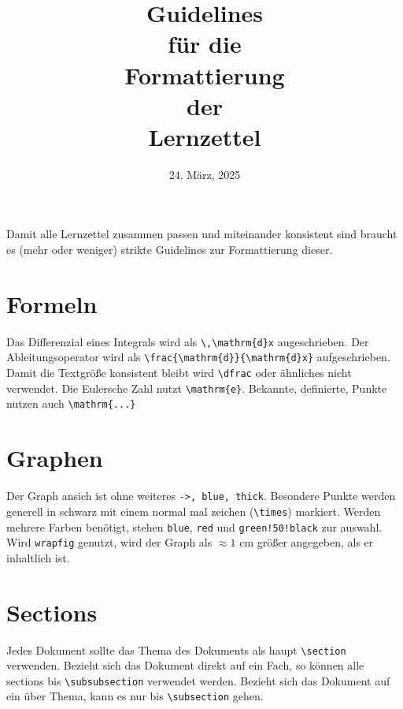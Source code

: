 \documentclass{article}
\title{
 \LARGE{Guidelines} \\
 \normalsize{für die} \\ [-0.8em]
 \LARGE{Formattierung} \\
 \normalsize{der} \\ [-0.8em]
 \LARGE{Lernzettel} 
}
\date{24. März, 2025}
\begin{document}
 
\maketitle
 
\noindent Damit alle Lernzettel zusammen passen und miteinander konsistent sind braucht es (mehr oder weniger) strikte Guidelines zur Formattierung dieser.
 
\section{Formeln}
Das Differenzial eines Integrals wird als \verb|\,\mathrm{d}x| augeschrieben. Der Ableitungsoperator wird als \verb|\frac{\mathrm{d}}{\mathrm{d}x}| aufgeschrieben. \newline
Damit die Textgröße konsistent bleibt wird \verb|\dfrac| oder ähnliches nicht verwendet. \newline
Die Eulersche Zahl nutzt \verb|\mathrm{e}|. Bekannte, definierte, Punkte nutzen auch \verb|\mathrm{...}|
 
\section{Graphen}
Der Graph ansich ist ohne weiteres \verb|->, blue, thick|. Besondere Punkte werden generell in schwarz mit einem normal mal zeichen (\verb|\times|) markiert. Werden mehrere Farben benötigt, stehen \verb|blue|, \verb|red| und \verb|green!50!black| zur auswahl. \newline
Wird \verb|wrapfig| genutzt, wird der Graph als $\approx 1$ cm größer angegeben, als er inhaltlich ist. 
 
\section{Sections}
Jedes Dokument sollte das Thema des Dokuments als haupt \verb|\section| verwenden. Bezieht sich das Dokument direkt auf ein Fach, so können alle sections bis \verb|\subsubsection| verwendet werden. Bezieht sich das Dokument auf ein über Thema, kann es nur bis \verb|\subsection| gehen.
 
\end{document}
